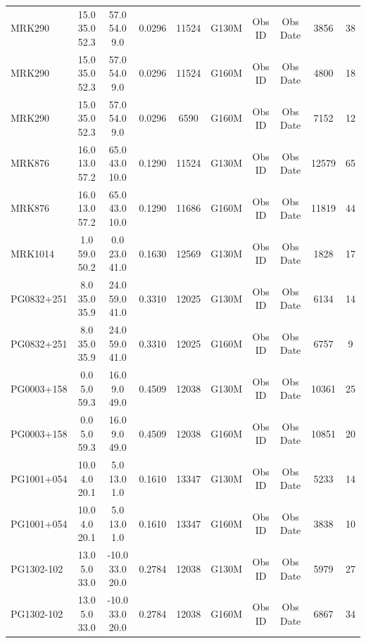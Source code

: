 \documentclass[iop]{emulateapj-rtx4}
\begin{document}
\begin{table}[ht]
\begin{center}
\begin{tabular}{l c c c c c c c c c}
MRK290  &                  15.0  35.0  52.3  &   57.0  54.0  9.0  &     0.0296  & 11524  &   G130M  &   Obs ID  & Obs Date  & 3856  &       38         \\
MRK290  &                  15.0  35.0  52.3  &   57.0  54.0  9.0  &     0.0296  & 11524  &   G160M  &   Obs ID  & Obs Date  & 4800  &       18         \\
MRK290  &                  15.0  35.0  52.3  &   57.0  54.0  9.0  &     0.0296  & 6590  &    G160M  &   Obs ID  & Obs Date  & 7152  &       12         \\
MRK876  &                  16.0  13.0  57.2  &   65.0  43.0  10.0  &    0.1290  & 11524  &   G130M  &   Obs ID  & Obs Date  & 12579  &      65         \\
MRK876  &                  16.0  13.0  57.2  &   65.0  43.0  10.0  &    0.1290  & 11686  &   G160M  &   Obs ID  & Obs Date  & 11819  &      44         \\
MRK1014  &                 1.0  59.0  50.2  &    0.0  23.0  41.0  &     0.1630  & 12569  &   G130M  &   Obs ID  & Obs Date  & 1828  &       17         \\
PG0832+251  &              8.0  35.0  35.9  &    24.0  59.0  41.0  &    0.3310  & 12025  &   G130M  &   Obs ID  & Obs Date  & 6134  &       14         \\
PG0832+251  &              8.0  35.0  35.9  &    24.0  59.0  41.0  &    0.3310  & 12025  &   G160M  &   Obs ID  & Obs Date  & 6757  &       9          \\
PG0003+158  &              0.0  5.0  59.3  &     16.0  9.0  49.0  &     0.4509  & 12038  &   G130M  &   Obs ID  & Obs Date  & 10361  &      25         \\
PG0003+158  &              0.0  5.0  59.3  &     16.0  9.0  49.0  &     0.4509  & 12038  &   G160M  &   Obs ID  & Obs Date  & 10851  &      20         \\
PG1001+054  &              10.0  4.0  20.1  &    5.0  13.0  1.0  &      0.1610  & 13347  &   G130M  &   Obs ID  & Obs Date  & 5233  &       14         \\
PG1001+054  &              10.0  4.0  20.1  &    5.0  13.0  1.0  &      0.1610  & 13347  &   G160M  &   Obs ID  & Obs Date  & 3838  &       10         \\
PG1302-102  &              13.0  5.0  33.0  &    -10.0  33.0  20.0  &   0.2784  & 12038  &   G130M  &   Obs ID  & Obs Date  & 5979  &       27         \\
PG1302-102  &              13.0  5.0  33.0  &    -10.0  33.0  20.0  &   0.2784  & 12038  &   G160M  &   Obs ID  & Obs Date  & 6867  &       34         \\

\end{tabular}
\end{center}
\end{table}
\end{document}
